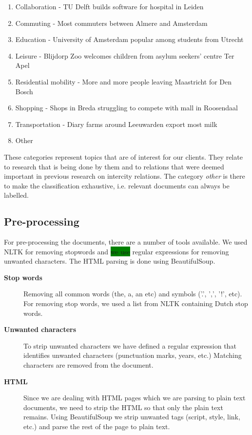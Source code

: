 \begin{enumerate}
    \item Collaboration - TU Delft builds software for hospital in Leiden
    \item Commuting - Most commuters between Almere and Amsterdam
    \item Education - University of Amsterdam popular among students from Utrecht
    \item Leisure - Blijdorp Zoo welcomes children from asylum seekers' centre Ter Apel
    \item Residential mobility - More and more people leaving Maastricht for Den Bosch
    \item Shopping - Shops in Breda struggling to compete with mall in Roosendaal
    \item Transportation - Diary farms around Leeuwarden export most milk
    \item Other
\end{enumerate}

These categories represent topics that are of interest for our clients. They relate to research that is being done by them and to relations that were deemed important in previous research on intercity relations. The category \textit{other} is there to make the classification exhaustive, i.e. relevant documents can always be labelled.

\subsection{Pre-processing}
For pre-processing the documents, there are a number of tools available. We used NLTK \cite{nlkt_stemming} for removing stopwords and \colorbox{green}{we use} regular expressions for removing unwanted characters. The HTML parsing is done using BeautifulSoup\cite{BeautifulSoup}.

\begin{description}
\item[\textbf{Stop words}]
Removing all common words (the, a, an etc) and symbols ('.', ',', '!', etc). For removing stop words, we used a list from NLTK containing Dutch stop words.
\item[\textbf{Unwanted characters}]
To strip unwanted characters we have defined a regular expression that identifies unwanted characters (punctuation marks, years, etc.) Matching characters are removed from the document. 
\item[\textbf{HTML}]
Since we are dealing with HTML pages which we are parsing to plain text documents, we need to strip the HTML so that only the plain text remains. Using BeautifulSoup we strip unwanted tags (script, style, link, etc.) and parse the rest of the page to plain text.
\end{description}

